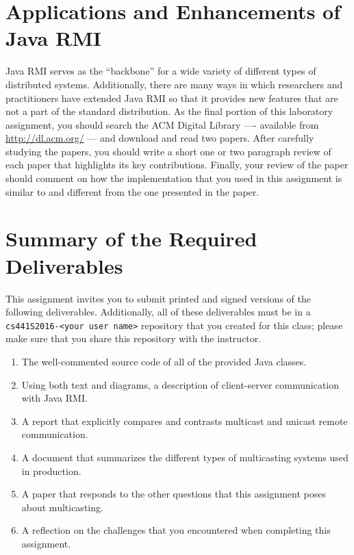 \section*{Applications and Enhancements of Java RMI}

Java RMI serves as the ``backbone'' for a wide variety of different types of distributed systems. Additionally, there
are many ways in which researchers and practitioners have extended Java RMI so that it provides new features that are
not a part of the standard distribution. As the final portion of this laboratory assignment, you should search the ACM
Digital Library ---- available from \url{http://dl.acm.org/} --- and download and read two papers. After carefully
studying the papers, you should write a short one or two paragraph review of each paper that highlights its key
contributions. Finally, your review of the paper should comment on how the implementation that you used in this
assignment is similar to and different from the one presented in the paper.

\section*{Summary of the Required Deliverables}

This assignment invites you to submit printed and signed versions of the following deliverables. Additionally,
all of these deliverables must be in a {\tt cs441S2016-<your user name>} repository that you created for this class;
please make sure that you share this repository with the instructor.

\vspace*{-.1in}

\begin{enumerate}
  \itemsep 0em

  \item The well-commented source code of all of the provided Java classes.

  \item Using both text and diagrams, a description of client-server communication with Java RMI.

  \item A report that explicitly compares and contrasts multicast and unicast remote communication.

  \item A document that summarizes the different types of multicasting systems used in production.

  \item A paper that responds to the other questions that this assignment poses about multicasting.

  \item A reflection on the challenges that you encountered when completing this assignment.

\end{enumerate}

